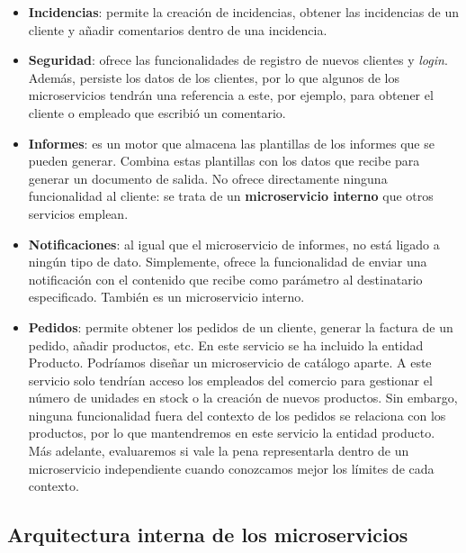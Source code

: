 \documentclass[11pt,spanish,listoffigures]{tfgetsinf}
\begin{document}
\begin{itemize}

\item \textbf{Incidencias}: permite la creación de incidencias, obtener las incidencias de un cliente y añadir comentarios dentro de una incidencia.

\item \textbf{Seguridad}: ofrece las funcionalidades de registro de nuevos clientes y \textit{login}. Además, persiste los datos de los clientes, por lo que algunos de los microservicios tendrán una referencia a este, por ejemplo, para obtener el cliente o empleado que escribió un comentario.

\item \textbf{Informes}: es un motor que almacena las plantillas de los informes que se pueden generar. Combina estas plantillas con los datos que recibe para generar un documento de salida. No ofrece directamente ninguna funcionalidad al cliente: se trata de un \textbf{microservicio interno} que otros servicios emplean.

\item \textbf{Notificaciones}: al igual que el microservicio de informes, no está ligado a ningún tipo de dato. Simplemente, ofrece la funcionalidad de enviar una notificación con el contenido que recibe como parámetro al destinatario especificado. También es un microservicio interno.

\item \textbf{Pedidos}: permite obtener los pedidos de un cliente, generar la factura de un pedido, añadir productos, etc. En este servicio se ha incluido la entidad Producto. Podríamos diseñar un microservicio de catálogo aparte. A este servicio solo tendrían acceso los empleados del comercio para gestionar el número de unidades en stock o la creación de nuevos productos. Sin embargo, ninguna funcionalidad fuera del contexto de los pedidos se relaciona con los productos, por lo que mantendremos en este servicio la entidad producto. Más adelante, evaluaremos si vale la pena representarla dentro de un microservicio independiente cuando conozcamos mejor los límites de cada contexto. 

\end{itemize}

\subsection{Arquitectura interna de los microservicios}
\end{document}
